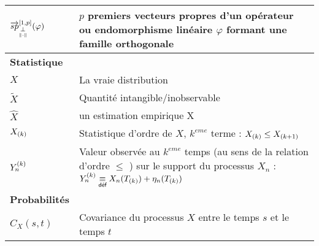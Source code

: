 \begin{tabularx}{\textwidth}{lX}
	$\overrightarrow{sp}_{\orthonormal}^{[1,p]}(\varphi)$            & $p$ premiers vecteurs propres d'un opérateur ou endomorphisme linéaire $\varphi$ formant une famille orthogonale                                                                                           \\
	\midrule
	\textbf{Statistique}                                             &                                                                                                                                                                                                            \\
	\midrule
	$X$                                                              & La \og vraie \fg distribution                                                                                                                                                                              \\
	$\widetilde{X}$                                                  & Quantité intangible/inobservable                                                                                                                                                                           \\
	$\widehat{X}$                                                    & un estimation empirique X                                                                                                                                                                                  \\
	$\ordered X k$                                                   & Statistique d'ordre de $X$, $k^{eme}$ terme : $\ordered X {k} \leq \ordered X {k+1}$                                                                                                                       \\
	$\statrang Y n {k}$                                              & Valeur observée au $k^{eme}$ temps (au sens de la relation d'ordre $\leq$ ) sur le support du processus $X_n$ : $\statrang Y n k \isdef X_n( \ordered T k ) + \eta_n( \ordered T k )$                      \\
	\midrule
	\textbf{Probabilités}                                            &                                                                                                                                                                                                            \\
	\midrule
	$C_X (s,t)$                                                      & Covariance du processus $X$ entre le temps $s$ et le temps $t$                                                                                                                                             \\

\end{tabularx}
